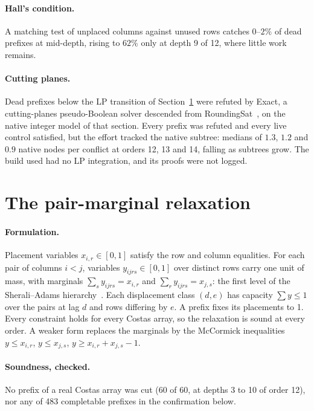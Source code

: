 \paragraph{Hall's condition.} A matching test of unplaced columns against unused rows catches $0$--$2\%$ of dead
prefixes at mid-depth, rising to $62\%$ only at depth 9 of 12, where little work remains.

\paragraph{Cutting planes.} Dead prefixes below the LP transition of Section~\ref{sec:lp} were refuted by Exact,
a cutting-planes pseudo-Boolean solver descended from RoundingSat~\cite{elffers2018}, on the native
integer model of that section. Every prefix was refuted and every live control satisfied, but the effort
tracked the native subtree: medians of $1.3$, $1.2$ and $0.9$ native nodes per conflict at orders 12, 13 and
14, falling as subtrees grow. The build used had no LP integration, and its proofs were not logged.

\section{The pair-marginal relaxation}
\label{sec:lp}
\paragraph{Formulation.} Placement variables $x_{i,r}\in[0,1]$ satisfy the row and column equalities. For each
pair of columns $i<j$, variables $y_{ijrs}\in[0,1]$ over distinct rows carry one unit of mass, with marginals
$\sum_s y_{ijrs}=x_{i,r}$ and $\sum_r y_{ijrs}=x_{j,s}$: the first level of the Sherali--Adams
hierarchy~\cite{sherali1990}. Each displacement class $(d,e)$ has capacity $\sum y\le1$ over the pairs at
lag $d$ and rows differing by $e$. A prefix fixes its placements to 1. Every constraint holds for every
Costas array, so the relaxation is sound at every order. A weaker form replaces the marginals by the
McCormick inequalities $y\le x_{i,r}$, $y\le x_{j,s}$, $y\ge x_{i,r}+x_{j,s}-1$.

\paragraph{Soundness, checked.} No prefix of a real Costas array was cut (60 of 60, at depths 3 to 10 of order
12), nor any of 483 completable prefixes in the confirmation below.

